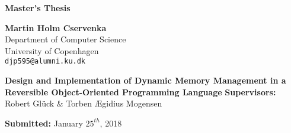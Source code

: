 \begin{titlepage}

\begin{flushleft}
\vspace*{3cm}
\textbf{\huge{Master's Thesis}}

\vspace*{3mm}
\textbf{Martin Holm Cservenka} \\
Department of Computer Science \\
University of Copenhagen \\
\texttt{djp595@alumni.ku.dk} 


\vspace*{4cm}
\textbf{\huge{Design and Implementation of Dynamic Memory Management in a Reversible Object-Oriented Programming Language}}
\vfill
\textbf{Supervisors:} Robert Glück \& Torben Ægidius Mogensen

\textbf{Submitted:} January $25^{th}$, 2018
\end{flushleft}
\end{titlepage}
